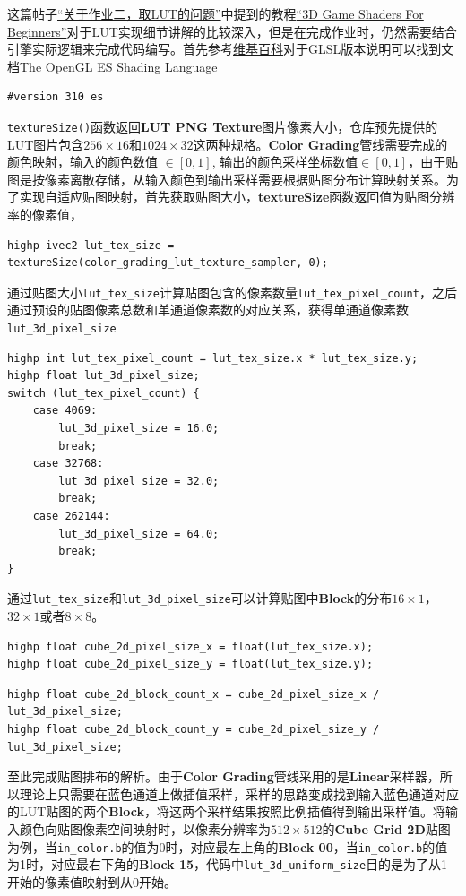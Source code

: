 \documentclass{ctexart}
\begin{document}
    这篇帖子\href{https://games-cn.org/forums/topic/guanyuzuoyeerqulutdewenti/}{“关于作业二，取LUT的问题”}中提到的教程\href{https://games-cn.org/forums/topic/guanyuzuoyeerqulutdewenti/}{“3D Game Shaders For Beginners”}对于LUT实现细节讲解的比较深入，但是在完成作业时，仍然需要结合引擎实际逻辑来完成代码编写。首先参考\href{https://en.wikipedia.org/wiki/OpenGL_Shading_Language}{维基百科}对于GLSL版本说明可以找到文档\href{https://registry.khronos.org/OpenGL/specs/es/3.1/GLSL_ES_Specification_3.10.withchanges.pdf}{The OpenGL ES Shading Language}    
    \begin{verbatim}
#version 310 es
    \end{verbatim}
    \verb|textureSize()|函数返回\textbf{LUT PNG Texture}图片像素大小，仓库预先提供的LUT图片包含$ 256\times16 $和$ 1024\times32 $这两种规格。\textbf{Color Grading}管线需要完成的颜色映射，输入的颜色数值 $ \in [0,1] $, 输出的颜色采样坐标数值$ \in [0,1] $，由于贴图是按像素离散存储，从输入颜色到输出采样需要根据贴图分布计算映射关系。为了实现自适应贴图映射，首先获取贴图大小，\textbf{textureSize}函数返回值为贴图分辨率的像素值，
    \begin{verbatim}
highp ivec2 lut_tex_size = textureSize(color_grading_lut_texture_sampler, 0);
    \end{verbatim}
    通过贴图大小\verb|lut_tex_size|计算贴图包含的像素数量\verb|lut_tex_pixel_count|，之后通过预设的贴图像素总数和单通道像素数的对应关系，获得单通道像素数\verb|lut_3d_pixel_size|
    \begin{verbatim}
highp int lut_tex_pixel_count = lut_tex_size.x * lut_tex_size.y;
highp float lut_3d_pixel_size;    
switch (lut_tex_pixel_count) {
    case 4069:
        lut_3d_pixel_size = 16.0;
        break;
    case 32768:
        lut_3d_pixel_size = 32.0;
        break;
    case 262144:
        lut_3d_pixel_size = 64.0;
        break;
}
    \end{verbatim}    
    通过\verb|lut_tex_size|和\verb|lut_3d_pixel_size|可以计算贴图中\textbf{Block}的分布$ 16\times1 $，$ 32\times1 $或者$ 8\times8 $。
    \begin{verbatim}
highp float cube_2d_pixel_size_x = float(lut_tex_size.x);
highp float cube_2d_pixel_size_y = float(lut_tex_size.y);
    \end{verbatim}
    \begin{verbatim}
highp float cube_2d_block_count_x = cube_2d_pixel_size_x / lut_3d_pixel_size;
highp float cube_2d_block_count_y = cube_2d_pixel_size_y / lut_3d_pixel_size;
    \end{verbatim}
    至此完成贴图排布的解析。由于\textbf{Color Grading}管线采用的是\textbf{Linear}采样器，所以理论上只需要在蓝色通道上做插值采样，采样的思路变成找到输入蓝色通道对应的LUT贴图的两个\textbf{Block}，将这两个采样结果按照比例插值得到输出采样值。将输入颜色向贴图像素空间映射时，以像素分辨率为$ 512\times512 $的\textbf{Cube Grid 2D}贴图为例，当\verb|in_color.b|的值为0时，对应最左上角的\textbf{Block 00}，当\verb|in_color.b|的值为1时，对应最右下角的\textbf{Block 15}，代码中\verb|lut_3d_uniform_size|目的是为了从1开始的像素值映射到从0开始。
\end{document}
